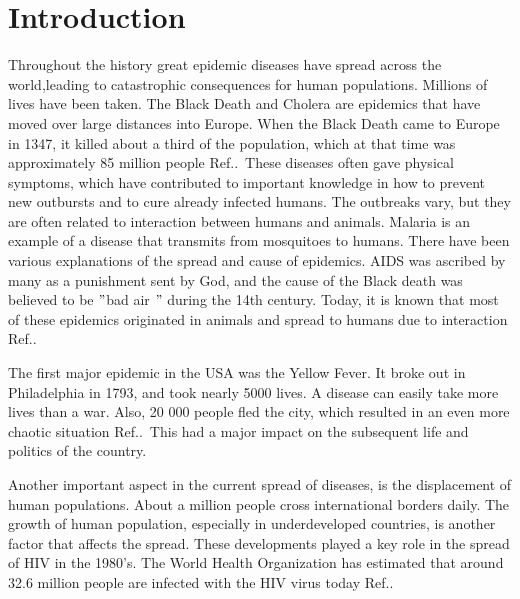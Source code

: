 \documentclass[%
twoside,                 %
final,                   %
chapterprefix=true,      %
open=right               %
10pt]{book}
\begin{document}
\chapter{Introduction}
Throughout the history great epidemic diseases have spread across the world,leading to catastrophic consequences for human populations. Millions of lives have been taken. The Black Death and Cholera are epidemics that have moved over large distances into Europe. When the Black Death came to Europe in 1347, it killed about a third of the population, which at that time was approximately 85 million people Ref.\cite[p.~315]{murray2002mathematical}.~These diseases often gave physical symptoms, which have contributed to important knowledge in how to prevent new outbursts and to cure already infected humans. The outbreaks vary, but they are often related to interaction between humans and animals. Malaria is an example of a disease that transmits from mosquitoes to humans. There have been various explanations of the spread and cause of epidemics. AIDS was ascribed by many as a punishment sent by God, and the cause of the Black death was believed to be $"$bad air $"$ during the 14th century. Today, it is known that most of these epidemics originated in animals and spread to humans due to interaction Ref.\cite[p.~316]{murray2002mathematical}.~


\vspace{3mm}




\vspace{3mm}


The first major epidemic in the USA was the Yellow Fever. It broke out in Philadelphia in 1793, and took nearly 5000 lives. A disease can easily take more lives than a war. Also, 20 000 people fled the city, which resulted in an even more chaotic situation Ref.\cite[p.~316]{murray2002mathematical}.~This had a major impact on the subsequent life and politics of the country.


\vspace{3mm}




\vspace{3mm}


Another important aspect in the current spread of diseases, is the displacement of human populations. About a million people cross international borders daily. The growth of human population, especially in underdeveloped countries, is another factor that affects the spread. These developments played a key role in the spread of HIV in the 1980's. The World Health Organization has estimated that around 32.6 million people are infected with the HIV virus today Ref.\cite{who_hiv}.
\end{document}
